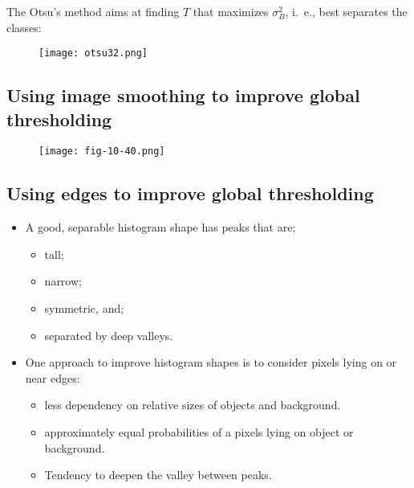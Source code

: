 \begin{frame}
The Otsu's method aims at finding $T$ that maximizes $\sigma_{B}^{2}$, i.~e., best separates the classes:
\begin{figure}[!h]
\texttt{[image: otsu32.png]}
\end{figure}
\end{frame}

\subsection{Using image smoothing to improve global thresholding}

\begin{frame}
\begin{figure}[!h]
\texttt{[image: fig-10-40.png]}
\end{figure}
\end{frame}

\subsection{Using edges to improve global thresholding}

\begin{frame}
\begin{itemize}
\item A good, separable histogram shape has peaks that are;
\begin{itemize}
\item tall;
\item narrow;
\item symmetric, and;
\item separated by deep valleys.
\end{itemize}
\item One approach to improve histogram shapes is to consider pixels lying on or near edges:
\begin{itemize}
\item less dependency on relative sizes of objects and background.
\item approximately equal probabilities of a pixels lying on object or background.
\item Tendency to deepen the valley between peaks.
\end{itemize}
\end{itemize}
\end{frame}

